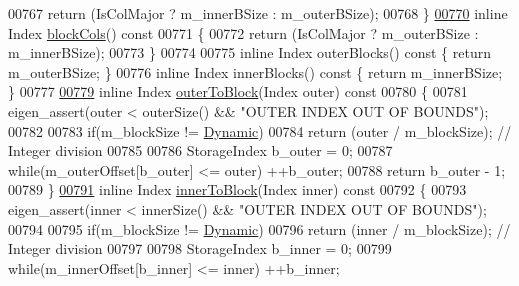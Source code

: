 \begin{DoxyCode}
00767       \textcolor{keywordflow}{return} (IsColMajor ? m\_innerBSize : m\_outerBSize);
00768     \}
\hyperlink{group___sparse_core___module_a645eb7f708ca89383e0f3fabb30d9e92}{00770}     \textcolor{keyword}{inline} Index \hyperlink{group___sparse_core___module_a645eb7f708ca89383e0f3fabb30d9e92}{blockCols}()\textcolor{keyword}{ const}
00771 \textcolor{keyword}{    }\{
00772       \textcolor{keywordflow}{return} (IsColMajor ? m\_outerBSize : m\_innerBSize);
00773     \}
00774 
00775     \textcolor{keyword}{inline} Index outerBlocks()\textcolor{keyword}{ const }\{ \textcolor{keywordflow}{return} m\_outerBSize; \}
00776     \textcolor{keyword}{inline} Index innerBlocks()\textcolor{keyword}{ const }\{ \textcolor{keywordflow}{return} m\_innerBSize; \}
00777 
\hyperlink{group___sparse_core___module_a9f83554f7b1309ac7ad88d19ef8d6339}{00779}     \textcolor{keyword}{inline} Index \hyperlink{group___sparse_core___module_a9f83554f7b1309ac7ad88d19ef8d6339}{outerToBlock}(Index outer)\textcolor{keyword}{ const}
00780 \textcolor{keyword}{    }\{
00781       eigen\_assert(outer < outerSize() && \textcolor{stringliteral}{"OUTER INDEX OUT OF BOUNDS"});
00782 
00783       \textcolor{keywordflow}{if}(m\_blockSize != \hyperlink{namespace_eigen_ad81fa7195215a0ce30017dfac309f0b2}{Dynamic})
00784         \textcolor{keywordflow}{return} (outer / m\_blockSize); \textcolor{comment}{// Integer division}
00785 
00786       StorageIndex b\_outer = 0;
00787       \textcolor{keywordflow}{while}(m\_outerOffset[b\_outer] <= outer) ++b\_outer;
00788       \textcolor{keywordflow}{return} b\_outer - 1;
00789     \}
\hyperlink{group___sparse_core___module_a53fd11658531b86986cd2a5fb2ea3d3d}{00791}     \textcolor{keyword}{inline} Index \hyperlink{group___sparse_core___module_a53fd11658531b86986cd2a5fb2ea3d3d}{innerToBlock}(Index inner)\textcolor{keyword}{ const}
00792 \textcolor{keyword}{    }\{
00793       eigen\_assert(inner < innerSize() && \textcolor{stringliteral}{"OUTER INDEX OUT OF BOUNDS"});
00794 
00795       \textcolor{keywordflow}{if}(m\_blockSize != \hyperlink{namespace_eigen_ad81fa7195215a0ce30017dfac309f0b2}{Dynamic})
00796         \textcolor{keywordflow}{return} (inner / m\_blockSize); \textcolor{comment}{// Integer division}
00797 
00798       StorageIndex b\_inner = 0;
00799       \textcolor{keywordflow}{while}(m\_innerOffset[b\_inner] <= inner) ++b\_inner;

\end{DoxyCode}

